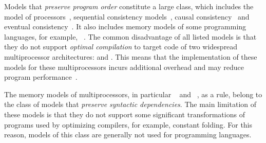 Models that \emph{preserve program order} constitute a large class, which includes the \TSO model of \Intel processors~\autocite{Sewell-al:CACM10}, sequential consistency models~\autocite{Lamport:TC79}, causal consistency~\autocite{Lahav-Boker:PLDI2020} and eventual consistency~\autocite{Jagadeesan-al:ESOP2018}.
It also includes memory models of some programming languages, for example, \OCaml~\autocite{Dolan-al:PLDI18}.
The common disadvantage of all listed models is that they do not support \emph{optimal compilation} to target code of two widespread multiprocessor architectures: \ARM and \POWER.
This means that the implementation of these models for these multiprocessors incurs additional overhead and 
may reduce program performance~\autocite{Ou-Demsky:OOPSLA18}.

The memory models of multiprocessors, in particular \ARM~\autocite{Pulte-al:POPL18} and \POWER~\autocite{Sarkar-al:PLDI11}, as a rule, belong to the class of models that \emph{ preserve syntactic dependencies}.
The main limitation of these models is that they do not support some significant transformations of programs used by optimizing compilers, for example, constant folding.
For this reason, models of this class are generally not used for programming languages.

